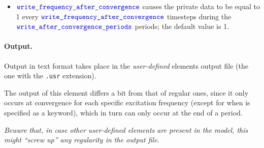 \begin{itemize}
\item $\textcolor{blue}{\texttt{write\_frequency\_after\_convergence}}$ causes the private data  to be equal to 1 
every $\textcolor{blue}{\texttt{write\_frequency\_after\_convergence}}$ timesteps during the 
$\textcolor{blue}{\texttt{write\_after\_convergence\_periods}}$ periods; the default value is 1. 
\end{itemize}

\paragraph{Output.}\label{hfelem_output}
Output in text format takes place in the \emph{user-defined} elements output file (the one with the \texttt{.usr} extension).

The output of this element differs a bit from that of regular ones, since it only occurs at convergence for each specific excitation frequency (except for when  is specified as a keyword), which in turn can only occur at the end of a period.

\bigskip

\begin{framed}
\noindent
\emph{Beware that, in case other user-defined elements are present in the model, this might ``screw up'' any regularity in the output file.}
\end{framed}

\bigskip

